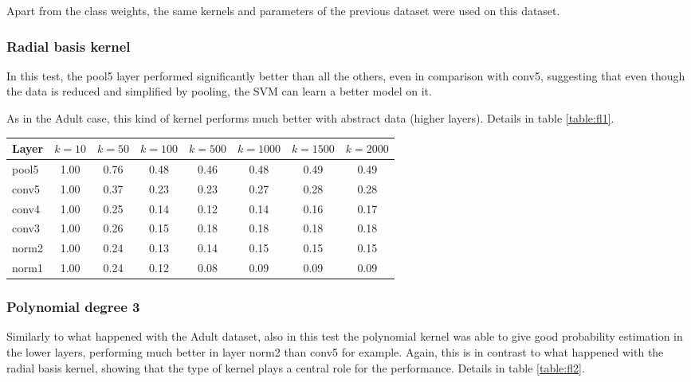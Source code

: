 Apart from the class weights, the same kernels and parameters of the previous
dataset were used on this dataset.

\subsubsection{Radial basis kernel}

In this test, the pool5 layer performed significantly better than all the
others, even in comparison with conv5, suggesting that even though the data is
reduced and simplified by pooling, the SVM can learn a better model on it.

As in the Adult case, this kind of kernel performs much better with abstract
data (higher layers). Details in table \ref{table:fl1}.

\begin{table*}[t!]
\caption{Average precision on Flower - Radial basis}
\centering
\begin{tabular}{lccccccc}
    Layer       & $k=10$ & $k=50$ & $k=100$ & $k=500$ & $k=1000$ & $k=1500$ &
    $k=2000$ \\
    \midrule
    pool5        & 1.00 & 0.76 & 0.48 & 0.46 & 0.48 & 0.49 & 0.49 \\
    conv5        & 1.00 & 0.37 & 0.23 & 0.23 & 0.27 & 0.28 & 0.28 \\
    conv4        & 1.00 & 0.25 & 0.14 & 0.12 & 0.14 & 0.16 & 0.17 \\
    conv3        & 1.00 & 0.26 & 0.15 & 0.18 & 0.18 & 0.18 & 0.18 \\
    norm2        & 1.00 & 0.24 & 0.13 & 0.14 & 0.15 & 0.15 & 0.15 \\
    norm1        & 1.00 & 0.24 & 0.12 & 0.08 & 0.09 & 0.09 & 0.09 \\
\end{tabular}
\label{table:fl1}
\end{table*}

\subsubsection{Polynomial degree 3}

Similarly to what happened with the Adult dataset, also in this test the
polynomial kernel was able to give good probability estimation in the lower
layers, performing much better in layer norm2 than conv5 for example. Again, this
is in contrast to what happened with the radial basis kernel, showing that the
type of kernel plays a central role for the performance. Details in table
\ref{table:fl2}.

